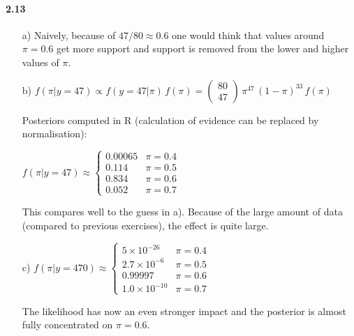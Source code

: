 \documentclass[fontsize=11pt,DIV=18,parskip=half]{scrartcl}
\begin{document}
\paragraph{2.13}
\begin{enumerate}
\item[a)] Naively, because of $47/80 \approx 0.6$ one would think that values around $\pi=0.6$ get more support and support is removed from the lower and higher values of $\pi$.
\item[b)] $f(\pi|y=47) \propto f(y=47|\pi)\, f(\pi) = \begin{pmatrix} 80 \\ 47 \end{pmatrix} \, \pi^{47} \, (1-\pi)^{33} \, f(\pi)$

Posteriors computed in R (calculation of evidence can be replaced by normalisation):

$f(\pi|y=47) \approx \left\{ \begin{array}{ll}0.00065 & \pi=0.4\\0.114 & \pi=0.5\\ 0.834 & \pi=0.6\\ 0.052  & \pi=0.7\end{array}\right.$ 

This compares well to the guess in a). Because of the large amount of data (compared to previous exercises), the effect is quite large.

\item[c)] $f(\pi|y=470) \approx \left\{ \begin{array}{ll}5\times10^{-26} & \pi=0.4\\2.7\times10^{-6} & \pi=0.5\\ 0.99997 & \pi=0.6\\ 1.0\times10^{-10}  & \pi=0.7\end{array}\right.$ 

The likelihood has now an even stronger impact and the posterior is almost fully concentrated on $\pi = 0.6$.
\end{enumerate}
\end{document}
